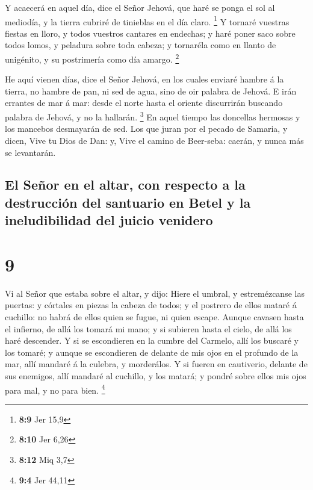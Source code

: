  Y acaecerá en aquel día, dice el Señor Jehová, que haré se
ponga el sol al mediodía, y la tierra cubriré de tinieblas en el día
claro. \footnote{\textbf{8:9} Jer 15,9}  Y tornaré vuestras
fiestas en lloro, y todos vuestros cantares en endechas; y haré poner
saco sobre todos lomos, y peladura sobre toda cabeza; y tornaréla como
en llanto de unigénito, y su postrimería como día amargo. \footnote{\textbf{8:10}
  Jer 6,26}

 He aquí vienen días, dice el Señor Jehová, en los cuales
enviaré hambre á la tierra, no hambre de pan, ni sed de agua, sino de
oir palabra de Jehová.  E irán errantes de mar á mar: desde
el norte hasta el oriente discurrirán buscando palabra de Jehová, y no
la hallarán. \footnote{\textbf{8:12} Miq 3,7}  En aquel
tiempo las doncellas hermosas y los mancebos desmayarán de sed.
 Los que juran por el pecado de Samaria, y dicen, Vive tu
Dios de Dan: y, Vive el camino de Beer-seba: caerán, y nunca más se
levantarán.

\hypertarget{el-seuxf1or-en-el-altar-con-respecto-a-la-destrucciuxf3n-del-santuario-en-betel-y-la-ineludibilidad-del-juicio-venidero}{%
\subsection{El Señor en el altar, con respecto a la destrucción del
santuario en Betel y la ineludibilidad del juicio
venidero}\label{el-seuxf1or-en-el-altar-con-respecto-a-la-destrucciuxf3n-del-santuario-en-betel-y-la-ineludibilidad-del-juicio-venidero}}

\hypertarget{section-8}{%
\section{9}\label{section-8}}

 Vi al Señor que estaba sobre el altar, y dijo: Hiere el
umbral, y estremézcanse las puertas: y córtales en piezas la cabeza de
todos; y el postrero de ellos mataré á cuchillo: no habrá de ellos quien
se fugue, ni quien escape.  Aunque cavasen hasta el
infierno, de allá los tomará mi mano; y si subieren hasta el cielo, de
allá los haré descender.  Y si se escondieren en la cumbre
del Carmelo, allí los buscaré y los tomaré; y aunque se escondieren de
delante de mis ojos en el profundo de la mar, allí mandaré á la culebra,
y morderálos.  Y si fueren en cautiverio, delante de sus
enemigos, allí mandaré al cuchillo, y los matará; y pondré sobre ellos
mis ojos para mal, y no para bien. \footnote{\textbf{9:4} Jer 44,11}


